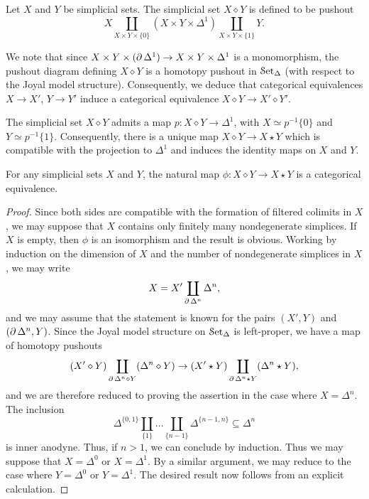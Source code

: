 \begin{definition}
Let $X$ and $Y$ be simplicial sets. The simplicial set $X \diamond Y$ is defined to be pushout
$$ X \coprod_{ X \times Y \times \{0\} } (X \times Y \times \Delta^1) \coprod_{X \times Y \times \{1\} } Y.$$
\end{definition}

We note that since $X \times Y \times (\operatorname{\partial} \Delta^1) \rightarrow X \times Y \times \Delta^1$ is a monomorphism, the pushout diagram defining $X \diamond Y$ is a homotopy pushout in $\operatorname{\mathcal{S}et_{\Delta}}$ (with respect to the Joyal model structure). Consequently, we deduce that categorical equivalences $X \rightarrow X'$, $Y \rightarrow Y'$ induce a categorical equivalence $X \diamond Y \rightarrow X' \diamond Y'$.

The simplicial set $X \diamond Y$ admits a map $p: X \diamond Y \rightarrow \Delta^1$, with
$X \simeq p^{-1} \{0\}$ and $Y \simeq p^{-1} \{1\}$. Consequently, there is a unique map
$X \diamond Y \rightarrow X \star Y$ which is compatible with the projection to $\Delta^1$ and induces the identity maps on $X$ and $Y$.

\begin{proposition}\label{rub3}
For any simplicial sets $X$ and $Y$, the natural map $\phi: X
\diamond Y \rightarrow X \star Y$ is a categorical equivalence.
\end{proposition}

\begin{proof}
Since both sides are compatible with the formation of filtered
colimits in $X$, we may suppose that $X$ contains only finitely
many nondegenerate simplices. If $X$ is empty, then $\phi$ is an isomorphism and the result is
obvious. Working by induction on the dimension of $X$ and the
number of nondegenerate simplices in $X$, we may write
$$ X = X' \coprod_{\operatorname{\partial} \Delta^{n}} \Delta^n,$$ and we may assume
that the statement is known for the pairs $(X',Y)$ and $(\operatorname{\partial}
\Delta^n, Y)$. Since the Joyal model structure on $\operatorname{\mathcal{S}et_{\Delta}}$ is
left-proper, we have a map of homotopy pushouts
$$ (X' \diamond Y) \coprod_{ \operatorname{\partial} \Delta^n \diamond Y } (\Delta^n
\diamond Y) \rightarrow (X' \star Y) \coprod_{ \operatorname{\partial} \Delta^n
\star Y} ( \Delta^n \star Y),$$ and we are therefore reduced
to proving the assertion in the case where $X = \Delta^n$.
The inclusion $$ \Delta^{ \{0,1\} } \coprod_{ \{1\} } \ldots \coprod_{ \{n-1\} }
\Delta^{ \{n-1,n\} } \subseteq \Delta^n$$ is inner anodyne. Thus, if
$n > 1$, we can conclude by induction. Thus we may suppose that
$X = \Delta^0$ or $X = \Delta^1$. By a similar argument, we may reduce to the case where
$Y = \Delta^0$ or $Y = \Delta^1$. The desired result now follows from an explicit calculation.
\end{proof}

